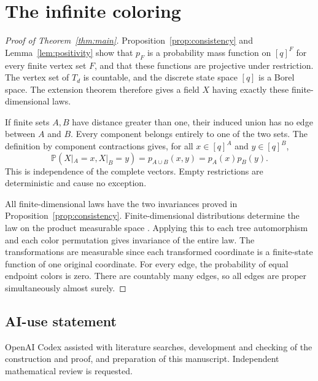 \documentclass[11pt]{amsart}
\begin{document}
\section{The infinite coloring}\label{sec:infinite}

\begin{proof}[Proof of Theorem~\ref{thm:main}]
Proposition~\ref{prop:consistency} and Lemma~\ref{lem:positivity} show that
$p_F$ is a probability mass function on $[q]^F$ for every finite vertex set
$F$, and that these functions are projective under restriction. The vertex
set of $T_d$ is countable, and the discrete state space $[q]$ is a Borel
space. The extension theorem \cite[Theorem 5.16, p.~92]{Kallenberg} therefore
gives a field $X$ having exactly these finite-dimensional laws.

If finite sets $A,B$ have distance greater than one, their induced union
has no edge between $A$ and $B$. Every component belongs entirely to one of
the two sets. The definition by component contractions gives, for all
$x\in[q]^A$ and $y\in[q]^B$,
\[
\mathbb P(X|_A=x,X|_B=y)=p_{A\cup B}(x,y)=p_A(x)p_B(y).
\]
This is independence of the complete vectors. Empty restrictions are
deterministic and cause no exception.

All finite-dimensional laws have the two invariances proved in
Proposition~\ref{prop:consistency}. Finite-dimensional distributions determine
the law on the product measurable space
\cite[Proposition 2.2, p.~25]{Kallenberg}. Applying this to each tree
automorphism and each color permutation gives invariance of the entire law.
The transformations are measurable since each transformed coordinate is a
finite-state function of one original coordinate. For every edge, the
probability of equal endpoint colors is zero. There are countably many
edges, so all edges are proper simultaneously almost surely.
\end{proof}

\subsection*{AI-use statement}
OpenAI Codex assisted with literature searches, development and checking of
the construction and proof, and preparation of this manuscript. Independent
mathematical review is requested.
\end{document}
